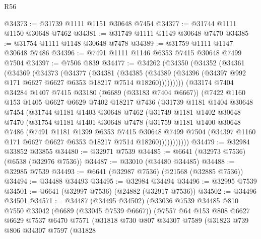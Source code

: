 \begin{lexlean}{R56}
\begin{coremodule}
@34373 := @31739 @1111 @1151 @30648 @7454
@34377 := @31744 @1111 @1150 @30648 @7462
@34381 := @31749 @1111 @1149 @30648 @7470
@34385 := @31754 @1111 @1148 @30648 @7478
@34389 := @31759 @1111 @1147 @30648 @7486
@34396 := @7491 @1111 @1146 @6353 @7415 @30648 @7499 @7504
@34397 := @7506 @839
@34477 := @34262
    (@34350
      (@34352
        (@34361
          (@34369
            (@34373
              (@34377
                (@34381
                  (@34385
                    (@34389 (@34396 (@34397 @992 @171 @6627 @6627 @6353 @18217 @7514 @18260)))))))))
        (@33174
          @7404
          @34284
          @1407
          @7415
          @33180
          (@6689 (@33183 @7404 @6667))
          (@7422
            @1160
            @153
            @1405
            @6627
            @6629
            @7402
            @18217
            @7436
            (@31739
              @1181
              @1404
              @30648
              @7454
              (@31744
                @1181
                @1403
                @30648
                @7462
                (@31749
                  @1181
                  @1402
                  @30648
                  @7470
                  (@31754
                    @1181
                    @1401
                    @30648
                    @7478
                    (@31759
                      @1181
                      @1400
                      @30648
                      @7486
                      (@7491
                        @1181
                        @1399
                        @6353
                        @7415
                        @30648
                        @7499
                        @7504
                        (@34397 @1160 @171 @6627 @6627 @6353 @18217 @7514 @18260)))))))))))
@34479 := @32984 @33852 @33855
@34480 := @32971 @7539
@34485 := @6641 (@32973 @7536) (@6538 (@32976 @7536))
@34487 := @33010 (@34480 @34485)
@34488 := @32985 @7539
@34493 := @6641 (@32987 @7536) (@21568 (@32885 @7536))
@34494 := @34488 @34493
@34495 := @32984 @34494
@34496 := @32995 @7539
@34501 := @6641 (@32997 @7536) (@24882 (@32917 @7536))
@34502 := @34496 @34501
@34571 := @34487
    (@34495 @34502)
    (@33036
      @7539
      @34485
      @810
      @7550
      @33042
      (@6689 (@33045 @7539 @6667))
      (@7557
        @64
        @153
        @808
        @6627
        @6629
        @7537
        @6470
        @7571
        (@31818
          @730
          @807
          @34307
          @7589
          (@31823
            @739
            @806
            @34307
            @7597
            (@31828

\end{coremodule}
\end{lexlean}
